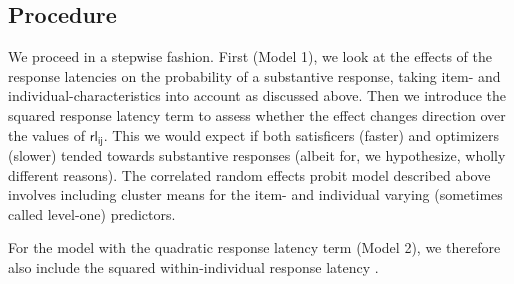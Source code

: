 \documentclass[Royal,times,sageh]{sagej}
\begin{document}
\hypertarget{procedure}{%
\subsection{Procedure}\label{procedure}}

We proceed in a stepwise fashion. First (Model 1), we look at the
effects of the response latencies on the probability of a substantive
response, taking item- and individual-characteristics into account as
discussed above. Then we introduce the squared response latency term to
assess whether the effect changes direction over the values of
\(\mathsf{rl_{ij}}\). This we would expect if both satisficers (faster)
and optimizers (slower) tended towards substantive responses (albeit
for, we hypothesize, wholly different reasons). The correlated random
effects probit model described above involves including cluster means
for the item- and individual varying (sometimes called level-one)
predictors.

For the model with the quadratic response latency term (Model 2), we
therefore also include the squared within-individual response latency
\citep[as per][p.~97]{Schunck2017}.
\end{document}
